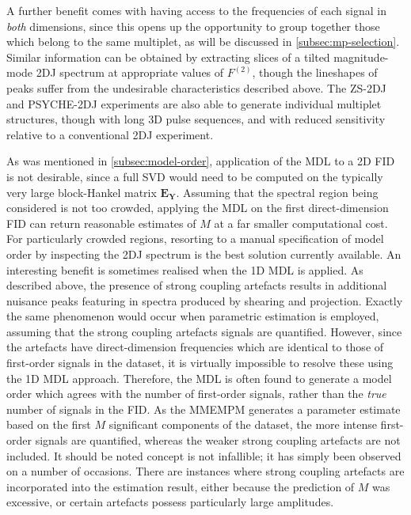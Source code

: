 A further benefit comes with having access to the frequencies of each
signal in \emph{both} dimensions, since this opens up the opportunity to group
together those which belong to the same multiplet, as will be discussed in
\cref{subsec:mp-selection}.
Similar information can be obtained
by extracting slices of a tilted magnitude-mode \ac{2DJ} spectrum at
appropriate values of $F^{(2)}$, though the lineshapes of peaks suffer from the
undesirable characteristics described above. The
\ac{ZS}-\ac{2DJ}\cite{Pell2007} and
\ac{PSYCHE}-\ac{2DJ}\cite{Foroozandeh2015,Kiraly2017} experiments are also able
to generate individual multiplet structures, though with long \ac{3D} pulse
sequences, and with reduced sensitivity relative to a conventional \ac{2DJ}
experiment.

As was mentioned in \cref{subsec:model-order}, application of the
\ac{MDL} to a \ac{2D} \ac{FID} is not desirable, since a full \ac{SVD} would
need to be computed on the typically very large block-Hankel matrix
$\symbf{E}_{\symbf{Y}}$.
Assuming that the spectral region being considered is not too
crowded, applying the \ac{MDL} on the first direct-dimension \ac{FID} can
return reasonable estimates of $M$ at a far smaller computational cost. For
particularly crowded regions, resorting to a manual specification of model
order by inspecting the \ac{2DJ} spectrum is the best solution currently
available.
An interesting benefit is sometimes realised when the \ac{1D} \ac{MDL} is
applied.
As described above, the presence of strong coupling artefacts results in
additional nuisance peaks featuring in spectra produced by shearing and
projection. Exactly the
same phenomenon would occur when parametric estimation is employed, assuming
that the strong coupling artefacts signals are quantified. However, since the
artefacts have direct-dimension frequencies which are identical to those of
first-order signals in the dataset, it is virtually impossible to resolve these
using the \ac{1D} \ac{MDL} approach. Therefore, the \ac{MDL} is often found to
generate a model order which agrees with the number of first-order signals,
rather than the \emph{true} number of signals in the \ac{FID}. As the
\ac{MMEMPM} generates a parameter estimate based on the first $M$ significant
components of the dataset, the more intense first-order signals are quantified,
whereas the weaker strong coupling artefacts are not included. It should be
noted concept is not infallible; it has simply been observed on a number of
occasions. There are instances where strong coupling artefacts are incorporated
into the estimation result, either because the prediction of $M$ was excessive,
or certain artefacts possess particularly large amplitudes.

